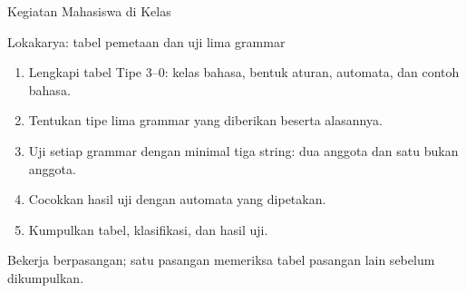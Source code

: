\documentclass[aspectratio=169,10pt,t]{beamer}
\begin{document}

\begin{frame}{Kegiatan Mahasiswa di Kelas}
  \begin{block}{Lokakarya: tabel pemetaan dan uji lima grammar}
    \footnotesize
    \begin{enumerate}
      \setlength{\itemsep}{1pt}
      \item Lengkapi tabel Tipe 3--0: kelas bahasa, bentuk aturan,
            automata, dan contoh bahasa.
      \item Tentukan tipe lima grammar yang diberikan beserta alasannya.
      \item Uji setiap grammar dengan minimal tiga string: dua anggota
            dan satu bukan anggota.
      \item Cocokkan hasil uji dengan automata yang dipetakan.
      \item Kumpulkan tabel, klasifikasi, dan hasil uji.
    \end{enumerate}
  \end{block}

  \vspace{4pt}
  {\footnotesize\color{ubbblue!80}Bekerja berpasangan; satu pasangan
  memeriksa tabel pasangan lain sebelum dikumpulkan.}
\end{frame}
\end{document}
